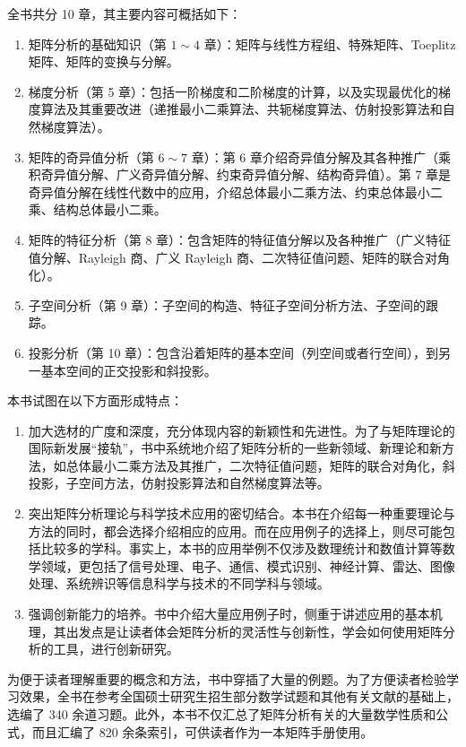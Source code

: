 \documentclass[punct=kaiming, fontset=fandol]{ctexbook}
\numberwithin{equation}{section}
\theoremstyle{mystyle}
\begin{document}
  全书共分 10 章，其主要内容可概括如下：
  \begin{enumerate}
    \item 矩阵分析的基础知识（第 $1\sim4$ 章）：矩阵与线性方程组、特殊矩阵、Toeplitz 矩阵、矩阵的变换与分解。
    \item 梯度分析（第 5 章）：包括一阶梯度和二阶梯度的计算，以及实现最优化的梯度算法及其重要改进（递推最小二乘算法、共轭梯度算法、仿射投影算法和自然梯度算法）。
    \item 矩阵的奇异值分析（第 $6\sim7$ 章）：第 6 章介绍奇异值分解及其各种推广（乘积奇异值分解、广义奇异值分解、约束奇异值分解、结构奇异值）。第 7 章是奇异值分解在线性代数中的应用，介绍总体最小二乘方法、约束总体最小二乘、结构总体最小二乘。
    \item 矩阵的特征分析（第 8 章）：包含矩阵的特征值分解以及各种推广（广义特征值分解、Rayleigh 商、广义 Rayleigh 商、二次特征值问题、矩阵的联合对角化）。
    \item 子空间分析（第 9 章）：子空间的构造、特征子空间分析方法、子空间的跟踪。
    \item 投影分析（第 10 章）：包含沿着矩阵的基本空间（列空间或者行空间），到另一基本空间的正交投影和斜投影。
  \end{enumerate}

  本书试图在以下方面形成特点：
  \begin{enumerate}
    \item 加大选材的广度和深度，充分体现内容的新颖性和先进性。为了与矩阵理论的国际新发展“接轨”，书中系统地介绍了矩阵分析的一些新领域、新理论和新方法，如总体最小二乘方法及其推广，二次特征值问题，矩阵的联合对角化，斜投影，子空间方法，仿射投影算法和自然梯度算法等。
    \item 突出矩阵分析理论与科学技术应用的密切结合。本书在介绍每一种重要理论与方法的同时，都会选择介绍相应的应用。而在应用例子的选择上，则尽可能包括比较多的学科。事实上，本书的应用举例不仅涉及数理统计和数值计算等数学领域，更包括了信号处理、电子、通信、模式识别、神经计算、雷达、图像处理、系统辨识等信息科学与技术的不同学科与领域。
    \item 强调创新能力的培养。书中介绍大量应用例子时，侧重于讲述应用的基本机理，其出发点是让读者体会矩阵分析的灵活性与创新性，学会如何使用矩阵分析的工具，进行创新研究。
  \end{enumerate}

  为便于读者理解重要的概念和方法，书中穿插了大量的例题。为了方便读者检验学习效果，全书在参考全国硕士研究生招生部分数学试题和其他有关文献的基础上，选编了 340 余道习题。此外，本书不仅汇总了矩阵分析有关的大量数学性质和公式，而且汇编了 820 余条索引，可供读者作为一本矩阵手册使用。
\end{document}
